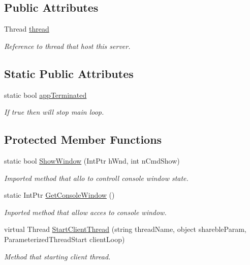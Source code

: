 \subsection*{Public Attributes}
\begin{DoxyCompactItemize}
\item 
Thread \mbox{\hyperlink{class_uniform_client_1_1_base_client_a458271823ca5e21612c0947e1db695a0}{thread}}
\begin{DoxyCompactList}\small\item\em Reference to thread that host this server. \end{DoxyCompactList}\end{DoxyCompactItemize}
\subsection*{Static Public Attributes}
\begin{DoxyCompactItemize}
\item 
static bool \mbox{\hyperlink{class_uniform_client_1_1_base_client_a1c02c6bb48c54e59c2581fe8097a4052}{app\+Terminated}}
\begin{DoxyCompactList}\small\item\em If true then will stop main loop. \end{DoxyCompactList}\end{DoxyCompactItemize}
\subsection*{Protected Member Functions}
\begin{DoxyCompactItemize}
\item 
static bool \mbox{\hyperlink{class_uniform_client_1_1_base_client_a47b6d88848854c59fafefeeae3956699}{Show\+Window}} (Int\+Ptr h\+Wnd, int n\+Cmd\+Show)
\begin{DoxyCompactList}\small\item\em Imported method that allo to controll console window state. \end{DoxyCompactList}\item 
static Int\+Ptr \mbox{\hyperlink{class_uniform_client_1_1_base_client_aafcfed25b79baed0db4448f2e30f2aa2}{Get\+Console\+Window}} ()
\begin{DoxyCompactList}\small\item\em Inported method that allow acces to console window. \end{DoxyCompactList}\item 
virtual Thread \mbox{\hyperlink{class_uniform_client_1_1_base_client_a194b46bb0e889d07cade81c0aeab7cea}{Start\+Client\+Thread}} (string thread\+Name, object shareble\+Param, Parameterized\+Thread\+Start client\+Loop)
\begin{DoxyCompactList}\small\item\em Method that starting client thread. \end{DoxyCompactList}\end{DoxyCompactItemize}
